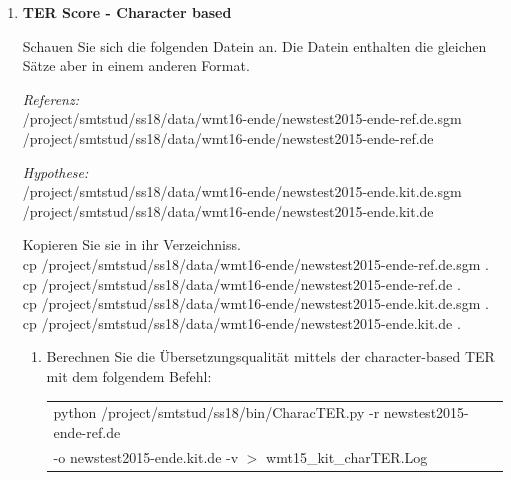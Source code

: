 \documentclass[12pt,fleqn]{article}
\begin{document}
\begin{enumerate}
\vspace{0.5cm} 
\item \textbf{TER Score - Character based} 

\vspace{0.5cm} 

Schauen Sie sich die folgenden Datein an. Die Datein enthalten die gleichen Sätze aber in einem anderen Format.

\vspace{0.5cm}  
\textit{Referenz: } \\ 
/project/smtstud/ss18/data/wmt16-ende/newstest2015-ende-ref.de.sgm \\ 
/project/smtstud/ss18/data/wmt16-ende/newstest2015-ende-ref.de 

\vspace{0.5cm} 
\textit{Hypothese: } \\ 
/project/smtstud/ss18/data/wmt16-ende/newstest2015-ende.kit.de.sgm \\ 
/project/smtstud/ss18/data/wmt16-ende/newstest2015-ende.kit.de 


\vspace{0.5cm} 
Kopieren Sie sie in ihr Verzeichniss. \\ 
cp /project/smtstud/ss18/data/wmt16-ende/newstest2015-ende-ref.de.sgm .  \\
cp /project/smtstud/ss18/data/wmt16-ende/newstest2015-ende-ref.de .  \\ 
cp /project/smtstud/ss18/data/wmt16-ende/newstest2015-ende.kit.de.sgm . \\ 
cp /project/smtstud/ss18/data/wmt16-ende/newstest2015-ende.kit.de . \\ 


\vspace{0.5cm} 
\begin{enumerate} 
\item Berechnen Sie die Übersetzungsqualität mittels der character-based TER mit dem folgendem Befehl:

\vspace{0.5cm} 
\begin{table}[h] 
 \begin{center} 
\begin{tabular}{l} 
python /project/smtstud/ss18/bin/CharacTER.py -r newstest2015-ende-ref.de \\ 
-o newstest2015-ende.kit.de -v $>$ wmt15\_kit\_charTER.Log \\ 
\end{tabular}
 \end{center}
\end{table}


\end{enumerate}
\end{enumerate}
\end{document}
